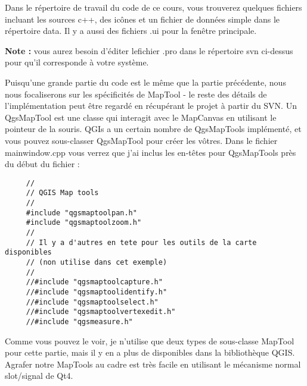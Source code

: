 Dans le répertoire de travail du code de ce cours, vous trouverez quelques 
fichiers incluant les sources c++, des icônes et un fichier de données simple 
dans le répertoire data. Il y a aussi des fichiers .ui pour la fenêtre principale.

\textbf{Note :} vous aurez besoin d'éditer lefichier .pro dans le répertoire svn 
ci-dessus pour qu'il corresponde à votre système.

Puisqu'une grande partie du code est le même que la partie précédente, nous nous
focaliserons sur les spécificités de MapTool - le reste des détails de 
l'implémentation peut être regardé en récupérant le projet à partir du SVN. Un 
QgsMapTool est une classe qui interagit avec le MapCanvas en utilisant le pointeur
 de la souris. QGIs a un certain nombre de QgsMapTools implémenté, et vous 
 pouvez sous-classer QgsMapTool pour créer les vôtres. Dans le fichier 
 mainwindow.cpp vous verrez que j'ai inclus les en-têtes pour QgsMapTools près 
 du début du fichier :
\begin{verbatim}
     //
     // QGIS Map tools
     //
     #include "qgsmaptoolpan.h"
     #include "qgsmaptoolzoom.h"
     //
     // Il y a d'autres en tete pour les outils de la carte disponibles
     // (non utilise dans cet exemple)
     //
     //#include "qgsmaptoolcapture.h"
     //#include "qgsmaptoolidentify.h"
     //#include "qgsmaptoolselect.h"
     //#include "qgsmaptoolvertexedit.h"
     //#include "qgsmeasure.h"
\end{verbatim}

Comme vous pouvez le voir, je n'utilise que deux types de sous-classe MapTool 
pour cette partie, mais il y en a plus de disponibles dans la bibliothèque QGIS.
Agrafer notre MapTools au cadre est très facile en utilisant le mécanisme normal 
slot/signal de Qt4.

